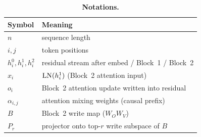 \documentclass{article}
\theoremstyle{plain}
\theoremstyle{definition}
\theoremstyle{remark}
\begin{document}
\begin{table}[t]
\centering
\small
\caption{\textbf{Notations.}}
\label{tab:notation}
\setlength{\tabcolsep}{5pt}
\begin{tabular}{@{}ll@{}}
\toprule
Symbol & Meaning \\
\midrule
$n$ & sequence length \\
$i,j$ & token positions \\
$h_i^0,h_i^1,h_i^2$ & residual stream after embed / Block~1 / Block~2 \\
$x_i$ & $\mathrm{LN}(h_i^1)$ (Block~2 attention input) \\
$o_i$ & Block~2 attention update written into residual \\
$\alpha_{i,j}$ & attention mixing weights (causal prefix) \\
$B$ & Block~2 write map ($W_O W_V$) \\
$P_r$ & projector onto top-$r$ write subspace of $B$ \\
\bottomrule
\end{tabular}
\vspace{-2mm}
\end{table}
\end{document}
